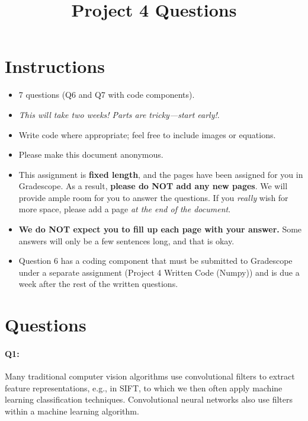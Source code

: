 \title{\vspace{-1cm}Project 4 Questions}



\maketitle
\vspace{-2cm}
\thispagestyle{fancy}

\section*{Instructions}
\begin{itemize}
    \item 7 questions (Q6 and Q7 with code components).
    \item \emph{This will take two weeks! Parts are tricky---start early!}.
    \item Write code where appropriate; feel free to include images or equations.
    \item Please make this document anonymous.
    \item This assignment is \textbf{fixed length}, and the pages have been assigned for you in Gradescope. As a result, \textbf{please do NOT add any new pages}. We will provide ample room for you to answer the questions. If you \emph{really} wish for more space, please add a page \emph{at the end of the document}.
    \item \textbf{We do NOT expect you to fill up each page with your answer.} Some answers will only be a few sentences long, and that is okay.
    \item Question 6 has a coding component that must be submitted to Gradescope under a separate assignment (Project 4 Written Code (Numpy)) and is due a week after the rest of the written questions.
\end{itemize}

\section*{Questions}


\paragraph{Q1:} Many traditional computer vision algorithms use convolutional filters to extract feature representations, e.g., in SIFT, to which we then often apply machine learning classification techniques. Convolutional neural networks also use filters within a machine learning algorithm.

